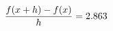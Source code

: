 \documentclass[preview]{standalone}
\begin{document}
\begin{align*}
\special{dvisvgm:raw <g id='unique000'>}\frac{f(x+h)-f(x)}{h} = 2.863\special{dvisvgm:raw </g>}
\end{align*}
\end{document}
